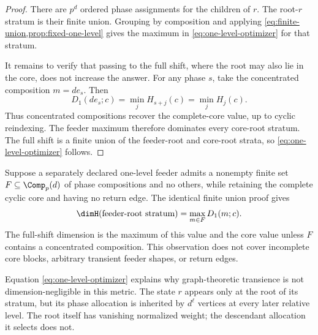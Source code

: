\begin{proof}
There are $p^d$ ordered phase assignments for the children of $r$.  The
root-$r$ stratum is their finite union.  Grouping by composition and applying
\cref{eq:finite-union,prop:fixed-one-level} gives the maximum in
\eqref{eq:one-level-optimizer} for that stratum.

It remains to verify that passing to the full shift, where the root may also
lie in the core, does not increase the answer.  For any phase $s$, take the
concentrated composition $m=de_s$.  Then
\begin{equation}
 D_1(de_s;c)=\min_j H_{s+j}(c)=\min_jH_j(c).
 \label{eq:concentrated-dominance}
\end{equation}
Thus concentrated compositions recover the complete-core value, up to cyclic
reindexing.  The feeder maximum therefore dominates every core-root stratum.
The full shift is a finite union of the feeder-root and core-root strata, so
\eqref{eq:one-level-optimizer} follows.
\end{proof}

\begin{remark}
\label{rem:finite-composition}
Suppose a separately declared one-level feeder admits a nonempty finite set
$F\subseteq\Comp_p(d)$ of phase compositions and no others, while retaining
the complete cyclic core and having no return edge.  The identical finite
union proof gives
\[
 \dimH(\text{feeder-root stratum})=\max_{m\in F}D_1(m;c).
\]
The full-shift dimension is the maximum of this value and the core value
unless $F$ contains a concentrated composition.  This observation does not
cover incomplete core blocks, arbitrary transient feeder shapes, or return
edges.
\end{remark}

Equation \eqref{eq:one-level-optimizer} explains why graph-theoretic
transience is not dimension-negligible in this metric.  The state $r$ appears
only at the root of its stratum, but its phase allocation is inherited by
$d^\ell$ vertices at every later relative level.  The root itself has
vanishing normalized weight; the descendant allocation it selects does not.
